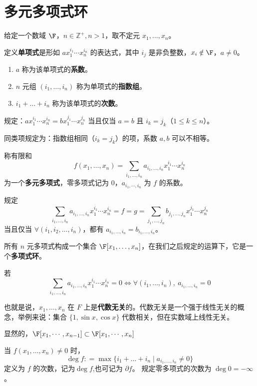 \section{多元多项式环}
\begin{definition}
	给定一个数域 \(\F \)，\( n \in \mathbb{Z}^+, n>1 \)，取不定元 \( x_1,\dots,x_n \)。
	
	定义\textbf{单项式}是形如 \( a x_1^{i_1} \cdots x_n^{i_n} \) 的表达式，其中 \( i_j \) 是非负整数，\( x_i \notin \F \)，\( a \neq 0 \)。
	\begin{enumerate}
		\item \( a \) 称为该单项式的\textbf{系数}。
		\item \( n \) 元组 \( (i_1,\dots,i_n) \) 称为单项式的\textbf{指数组}。
		\item \( i_1+\dots+i_n \) 称为该单项式的\textbf{次数}。
	\end{enumerate}
	
	
	规定：\( a x_1^{i_1} \cdots x_n^{i_n} = b x_1^{j_1} \cdots x_n^{j_n} \) 当且仅当 \( a=b \) 且 \( i_k=j_k \)（\( 1 \le k \le n \)）。
	
	同类项规定为：指数组相同（\( i_k=j_k \)）的项，系数 \( a,b \) 可以不相等。
	
	称有限和
	\[
	f(x_1,\dots,x_n)=\sum_{i_1,\dots,i_n} a_{i_1,\dots,i_n} x_1^{i_1} \cdots x_n^{i_n}
	\]
	为一个\textbf{多元多项式}，零多项式记为 \( 0 \)，\( a_{i_1,\cdots,i_n} \) 为 \( f \) 的系数。
	
	规定
	\[
	\sum_{i_1,\dots,i_n} a_{i_1,\dots,i_n} x_1^{i_1} \cdots x_n^{i_n} = f = g = \sum_{j_1,\dots,j_n} b_{j_1,\dots,j_n} x_1^{j_1} \cdots x_n^{j_n}
	\]
	当且仅当 \( \forall (i_1,i_2,\dots,i_n) \)，都有 \( a_{i_1,\dots,i_n} = b_{i_1,\dots,i_n} \)。
	
	所有 \( n \) 元多项式构成一个集合 \( \F[x_1,\dots,x_n] \)，在我们之后规定的运算下，它是一个\textbf{多项式环}。
	
	若\[
	\sum_{i_1,\dots,i_n} a_{i_1,\dots,i_n} x_1^{i_1} \cdots x_n^{i_n} = 0 \iff \forall (i_1,\dots,i_n),\ a_{i_1,\dots,i_n}=0
	\]
	
	也就是说，\( x_1,\dots,x_n \) 在 \( F \) 上是\textbf{代数无关}的。代数无关是一个强于线性无关的概念，举例来说：集合 \( \{1,\sin x,\cos x\} \) 代数相关，但在实数域上线性无关。
	
\end{definition}
显然的，$\F[x_1,\cdots,x_{n-1}]\subset\F[x_1,\cdots,x_{n}]$
\begin{definition}
	当 \( f(x_1,\dots,x_n) \neq 0 \) 时，
	\[
	\deg f: = \max\{i_1+\dots+i_n \mid a_{i_1,\dots,i_n} \neq 0\}
	\]
	定义为 \( f \) 的次数，记为$\deg f$,也可记为 \( \partial f \)。
	规定零多项式的次数为 \( \deg 0 = -\infty \)。
\end{definition}
